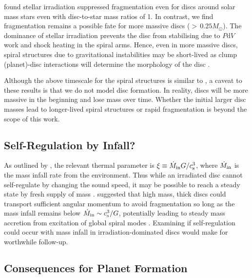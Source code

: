 \documentclass[usenatbib]{mnras}
\begin{document}
\cite{2020aCadman} found stellar irradiation suppressed fragmentation even for discs around solar mass stars even with disc-to-star mass ratios of 1. In contrast, we find fragmentation remains a possible fate for more massive discs (${>}\,0.25M_\odot$). The dominance of stellar irradiation prevents the disc from stabilising due to $P\mathrm{d}V$ work and shock heating in the spiral arms. Hence, even in more massive discs, spiral structures due to gravitational instabilities may be short-lived as clump (planet)-disc interactions will determine the morphology of the disc \citep{2020bRowther,2022bRowther}.

Although the above timescale for the spiral structures is similar to \cite{2019Hall}, a caveat to these results is that we do not model disc formation. In reality, discs will be more massive in the beginning and lose mass over time. Whether the initial larger disc masses lead to longer-lived spiral structures or rapid fragmentation is beyond the scope of this work.

\subsection{Self-Regulation by Infall?}
As outlined by \citet{2010aKratter}, the relevant thermal parameter is $\xi \equiv \dot{M}_{\rm in} G/ c_{\rm s}^3$, where $\dot{M}_{\rm in}$ is the mass infall rate from the environment. Thus while an irradiated disc cannot self-regulate by changing the sound speed, it may be possible to reach a steady state by fresh supply of mass \citep{2016Kratter}. \citet{2011Kratter} suggested that high mass, thick discs could transport sufficient angular momentum to avoid fragmentation so long as the mass infall remains below $\dot{M}_{\rm in} \sim c_{\rm s}^3/G$, potentially leading to steady mass accretion from excitation of global spiral modes \citep[see][]{1997Laughlin}. Examining if self-regulation could occur with mass infall in irradiation-dominated discs would make for worthwhile follow-up.

\subsection{Consequences for Planet Formation}
\end{document}
